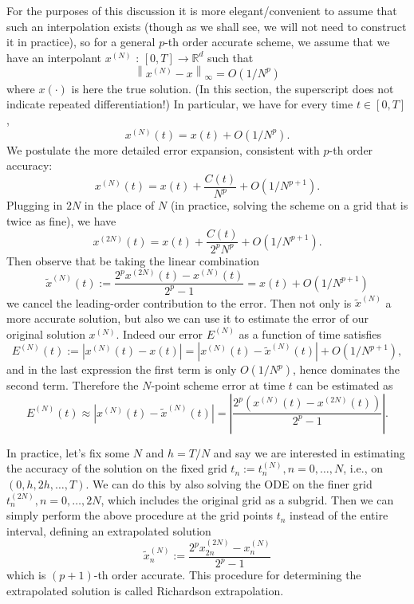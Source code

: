 For the purposes of this discussion it is more elegant/convenient to assume that such an interpolation exists (though as we shall see, we will not need to construct it in practice), so for a general $p$-th order accurate scheme, we assume that we have an interpolant $x^{(N)}$ : $[0, T] \rightarrow \mathbb{R}^d$ such that
$$
\left\|x^{(N)}-x\right\|_{\infty}=O\left(1 / N^p\right)
$$
where $x(\cdot)$ is here the true solution. (In this section, the superscript does not indicate repeated differentiation!) In particular, we have for every time $t \in[0, T]$,
$$
x^{(N)}(t)=x(t)+O\left(1 / N^p\right) .
$$
We postulate the more detailed error expansion, consistent with $p$-th order accuracy:
$$
x^{(N)}(t)=x(t)+\frac{C(t)}{N^p}+O\left(1 / N^{p+1}\right) .
$$
Plugging in $2 N$ in the place of $N$ (in practice, solving the scheme on a grid that is twice as fine), we have
$$
x^{(2 N)}(t)=x(t)+\frac{C(t)}{2^p N^p}+O\left(1 / N^{p+1}\right) .
$$
Then observe that be taking the linear combination
$$
\tilde{x}^{(N)}(t):=\frac{2^p x^{(2 N)}(t)-x^{(N)}(t)}{2^p-1}=x(t)+O\left(1 / N^{p+1}\right)
$$
we cancel the leading-order contribution to the error.
Then not only is $\tilde{x}^{(N)}$ a more accurate solution, but also we can use it to estimate the error of our original solution $x^{(N)}$. Indeed our error $E^{(N)}$ as a function of time satisfies
$$
E^{(N)}(t):=\left|x^{(N)}(t)-x(t)\right|=\left|x^{(N)}(t)-\tilde{x}^{(N)}(t)\right|+O\left(1 / N^{p+1}\right)  ,
$$
and in the last expression the first term is only $O\left(1 / N^p\right)$, hence dominates the second term. Therefore the $N$-point scheme error at time $t$ can be estimated as
$$
E^{(N)}(t) \approx\left|x^{(N)}(t)-\tilde{x}^{(N)}(t)\right| = \left| \frac{2^{p}(x^{(N)}(t) - x^{(2N)}(t))}{2^{p}-1} \right| .
$$





\begin{definition}
\label{def: Richardson extrapolation}
In practice, let's fix some $N$ and $h=T / N$ and say we are interested in estimating the accuracy of the solution on the fixed grid $t_n:=t_n^{(N)}, n=0, \ldots, N$, i.e., on $(0, h, 2 h, \ldots, T)$. We can do this by also solving the ODE on the finer grid $t_n^{(2 N)}, n=0, \ldots, 2 N$, which includes the original grid as a subgrid. Then we can simply perform the above procedure at the grid points $t_n$ instead of the entire interval, defining an extrapolated solution
$$
\tilde{x}_n^{(N)}:=\frac{2^p x_{2 n}^{(2 N)}-x_n^{(N)}}{2^p-1}
$$
which is $(p+1)$-th order accurate. This procedure for determining the extrapolated solution is called Richardson extrapolation.
\end{definition}


